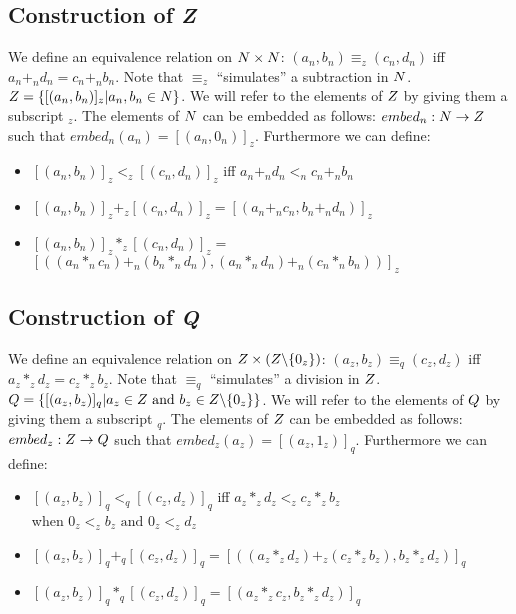 \subsection{Construction of \sl Z}

We define an equivalence relation on $N \times N$: $(a_n,b_n) \equiv_z
(c_n,d_n)$ iff $a_n +_n d_n = c_n +_n b_n$. Note that $\equiv_z$
``simulates'' a subtraction in $N$. $Z = \{[(a_n,b_n)]_z | a_n, b_n \in
N\}$. We will refer to the elements of $Z$ by giving them a subscript $_z$.
The elements of $N$ can be embedded as follows: $embed_n: N \rightarrow Z$
such that $embed_n(a_n) = [(a_n,0_n)]_z$. Furthermore we can define:
\begin{itemize}
\item $[(a_n,b_n)]_z <_z [(c_n,d_n)]_z$ iff $a_n +_n d_n <_n c_n +_n b_n$
\item $[(a_n,b_n)]_z +_z [(c_n,d_n)]_z = [(a_n +_n c_n, b_n +_n d_n)]_z$
\item $[(a_n,b_n)]_z *_z [(c_n,d_n)]_z =$ \\
      $[\left((a_n *_n c_n) +_n (b_n *_n d_n), (a_n *_n d_n) +_n (c_n *_n
      b_n)\right)]_z$
\end{itemize}

\subsection{Construction of \sl Q}

We define an equivalence relation on $Z \times (Z \backslash \{0_z\})$:
$(a_z,b_z) \equiv_q (c_z,d_z)$ iff $a_z *_z d_z = c_z *_z b_z$. Note that
$\equiv_q$ ``simulates'' a division in $Z$. $Q = \{[(a_z,b_z)]_q | a_z \in
Z \mbox{ and } b_z \in Z \backslash \{0_z\}\}$. We will refer to the
elements of $Q$ by giving them a subscript $_q$. The elements of $Z$ can be
embedded as follows: $embed_z: Z \rightarrow Q$ such that $embed_z(a_z) =
[(a_z,1_z)]_q$. Furthermore we can define:
\begin{itemize}
\item $[(a_z,b_z)]_q <_q [(c_z,d_z)]_q$ iff $a_z *_z d_z <_z c_z *_z b_z$ \\
      when $0_z <_z b_z \mbox{ and } 0_z <_z d_z$
\item $[(a_z,b_z)]_q +_q [(c_z,d_z)]_q = [\left((a_z *_z d_z) +_z (c_z *_z
      b_z), b_z *_z d_z\right)]_q$
\item $[(a_z,b_z)]_q *_q [(c_z,d_z)]_q = [(a_z *_z c_z, b_z *_z d_z)]_q$
\end{itemize}

